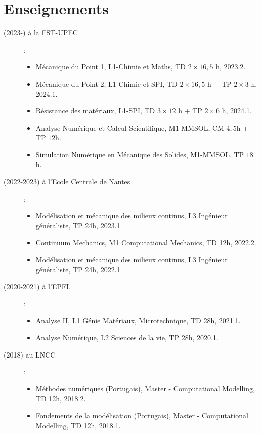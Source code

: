 \documentclass[french]{article}
\begin{document}
\section*{Enseignements}
\begin{description}
\item[(2023-) à la FST-UPEC]:
\begin{itemize}
\item Mécanique du Point 1, L1-Chimie et Maths, TD $2\times 16,5$ h, 2023.2.  
\item Mécanique du Point 2, L1-Chimie et SPI, TD $2\times 16,5$ h + TP $2\times3$ h,  2024.1.
\item Résistance des matériaux, L1-SPI, TD $3\times 12$ h + TP $2\times6$ h,  2024.1. 
\item Analyse Numérique et Calcul Scientifique, M1-MMSOL, CM $4,5$h + TP $12$h.  
\item Simulation Numérique en Mécanique des Solides, M1-MMSOL, TP $18$h.
\end{itemize}
\item[(2022-2023) à l'Ecole Centrale de Nantes]:
\begin{itemize}
	\item Modélisation et mécanique des milieux continus, L3 Ingénieur généraliste, TP 24h, 2023.1.
	\item Continuum Mechanics, M1 Computational Mechanics, TD 12h, 2022.2.  
	\item Modélisation et mécanique des milieux continus, L3 Ingénieur généraliste, TP 24h, 2022.1.
\end{itemize}
\item[(2020-2021) à l'EPFL]:
\begin{itemize}
\item Analyse II, L1 Génie Matériaux, Microtechnique, TD 28h, 2021.1.
\item Analyse Numérique, L2 Sciences de la vie, TP 28h, 2020.1.  
\end{itemize}
\item[(2018) au LNCC]:
\begin{itemize}
\item Méthodes numériques (Portugais), Master - Computational Modelling, TD 12h, 2018.2.  
\item Fondements de la modélisation (Portugais), Master - Computational Modelling, TD 12h, 2018.1.
\end{itemize}
\end{description}
\end{document}
